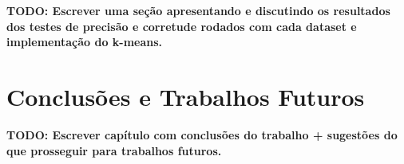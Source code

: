 \documentclass[12pt,
openright, 
oneside, %
a4paper,    %
brazil]{facom-ufu-abntex2}
\begin{document}
\textbf{TODO: Escrever uma seção apresentando e discutindo os resultados dos testes de precisão e corretude rodados com cada dataset e implementação do k-means.}






\chapter{Conclusões e Trabalhos Futuros}


\textbf{TODO: Escrever capítulo com conclusões do trabalho + sugestões do que prosseguir para trabalhos futuros.}











\postextual








  

\end{document}
